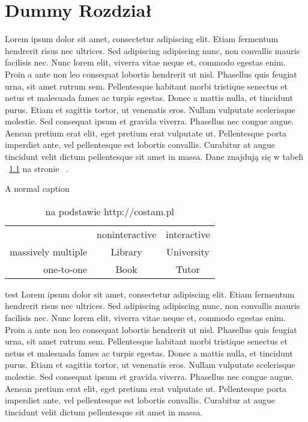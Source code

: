 \chapter{Dummy Rozdział}
Lorem ipsum dolor sit amet, consectetur adipiscing elit. Etiam fermentum hendrerit risus nec ultrices. Sed adipiscing adipiscing nunc, non convallis mauris facilisis nec. Nunc lorem elit, viverra vitae neque et, commodo egestas enim. Proin a ante non leo consequat lobortis hendrerit ut nisl. Phasellus quis feugiat urna, sit amet rutrum sem. Pellentesque habitant morbi tristique senectus et netus et malesuada fames ac turpis egestas. Donec a mattis nulla, et tincidunt purus. Etiam et sagittis tortor, ut venenatis eros. Nullam vulputate scelerisque molestie. Sed consequat ipsum et gravida viverra. Phasellus nec congue augue. Aenean pretium erat elit, eget pretium erat vulputate ut. Pellentesque porta imperdiet ante, vel pellentesque est lobortis convallis. Curabitur at augue tincidunt velit dictum pellentesque sit amet in massa. Dane znajdują się w tabeli ~\ref{tab:testowa} na stronie ~\pageref{tab:testowa}.
\begin{table}[h] %
	\caption{A normal caption}
	\begin{tabular}{ r|c|c| }
		\multicolumn{1}{r}{}
 		&  \multicolumn{1}{c}{noninteractive}
 		& \multicolumn{1}{c}{interactive} \\
		\cline{2-3}
		massively multiple & Library & University \\
		\cline{2-3}
		one-to-one & Book & Tutor \\
		\cline{2-3}
	\end{tabular}
	\caption*{na podstawie http://costam.pl}
	\label{tab:testowa}
\end{table}
test %
Lorem ipsum dolor sit amet, consectetur adipiscing elit. Etiam fermentum hendrerit risus nec ultrices. Sed adipiscing adipiscing nunc, non convallis mauris facilisis nec. Nunc lorem elit, viverra vitae neque et, commodo egestas enim. Proin a ante non leo consequat lobortis hendrerit ut nisl. Phasellus quis feugiat urna, sit amet rutrum sem. Pellentesque habitant morbi tristique senectus et netus et malesuada fames ac turpis egestas. Donec a mattis nulla, et tincidunt purus. Etiam et sagittis tortor, ut venenatis eros. Nullam vulputate scelerisque molestie. Sed consequat ipsum et gravida viverra. Phasellus nec congue augue. Aenean pretium erat elit, eget pretium erat vulputate ut. Pellentesque porta imperdiet ante, vel pellentesque est lobortis convallis. Curabitur at augue tincidunt velit dictum pellentesque sit amet in massa.

